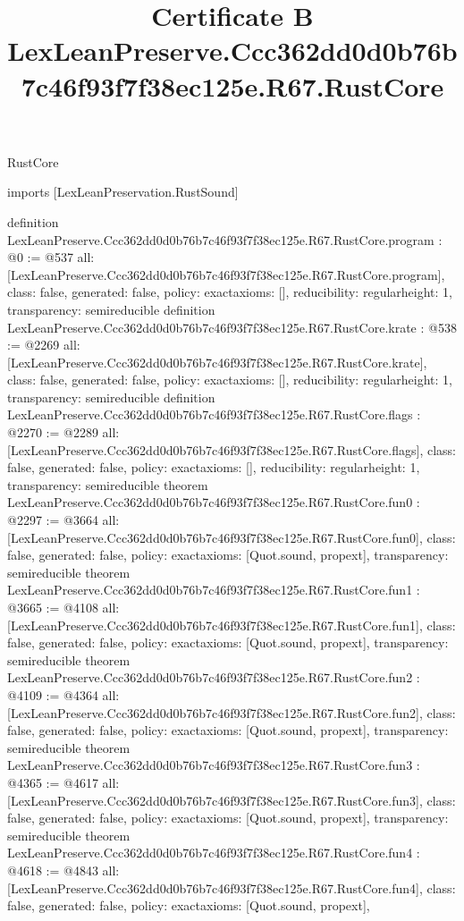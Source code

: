 \begin{lexlean}{RustCore}
\title{Certificate B LexLeanPreserve.Ccc362dd0d0b76b7c46f93f7f38ec125e.R67.RustCore}
\begin{coremodule}
imports [LexLeanPreservation.RustSound]

definition LexLeanPreserve.Ccc362dd0d0b76b7c46f93f7f38ec125e.R67.RustCore.program : @0 := @537 {
  all: [LexLeanPreserve.Ccc362dd0d0b76b7c46f93f7f38ec125e.R67.RustCore.program],
  class: false,
  generated: false,
  policy: exact{axioms: []},
  reducibility: regular{height: 1},
  transparency: semireducible
}
definition LexLeanPreserve.Ccc362dd0d0b76b7c46f93f7f38ec125e.R67.RustCore.krate : @538 := @2269 {
  all: [LexLeanPreserve.Ccc362dd0d0b76b7c46f93f7f38ec125e.R67.RustCore.krate],
  class: false,
  generated: false,
  policy: exact{axioms: []},
  reducibility: regular{height: 1},
  transparency: semireducible
}
definition LexLeanPreserve.Ccc362dd0d0b76b7c46f93f7f38ec125e.R67.RustCore.flags : @2270 := @2289 {
  all: [LexLeanPreserve.Ccc362dd0d0b76b7c46f93f7f38ec125e.R67.RustCore.flags],
  class: false,
  generated: false,
  policy: exact{axioms: []},
  reducibility: regular{height: 1},
  transparency: semireducible
}
theorem LexLeanPreserve.Ccc362dd0d0b76b7c46f93f7f38ec125e.R67.RustCore.fun0 : @2297 := @3664 {
  all: [LexLeanPreserve.Ccc362dd0d0b76b7c46f93f7f38ec125e.R67.RustCore.fun0],
  class: false,
  generated: false,
  policy: exact{axioms: [Quot.sound, propext]},
  transparency: semireducible
}
theorem LexLeanPreserve.Ccc362dd0d0b76b7c46f93f7f38ec125e.R67.RustCore.fun1 : @3665 := @4108 {
  all: [LexLeanPreserve.Ccc362dd0d0b76b7c46f93f7f38ec125e.R67.RustCore.fun1],
  class: false,
  generated: false,
  policy: exact{axioms: [Quot.sound, propext]},
  transparency: semireducible
}
theorem LexLeanPreserve.Ccc362dd0d0b76b7c46f93f7f38ec125e.R67.RustCore.fun2 : @4109 := @4364 {
  all: [LexLeanPreserve.Ccc362dd0d0b76b7c46f93f7f38ec125e.R67.RustCore.fun2],
  class: false,
  generated: false,
  policy: exact{axioms: [Quot.sound, propext]},
  transparency: semireducible
}
theorem LexLeanPreserve.Ccc362dd0d0b76b7c46f93f7f38ec125e.R67.RustCore.fun3 : @4365 := @4617 {
  all: [LexLeanPreserve.Ccc362dd0d0b76b7c46f93f7f38ec125e.R67.RustCore.fun3],
  class: false,
  generated: false,
  policy: exact{axioms: [Quot.sound, propext]},
  transparency: semireducible
}
theorem LexLeanPreserve.Ccc362dd0d0b76b7c46f93f7f38ec125e.R67.RustCore.fun4 : @4618 := @4843 {
  all: [LexLeanPreserve.Ccc362dd0d0b76b7c46f93f7f38ec125e.R67.RustCore.fun4],
  class: false,
  generated: false,
  policy: exact{axioms: [Quot.sound, propext]},
}
\end{coremodule}
\end{lexlean}
